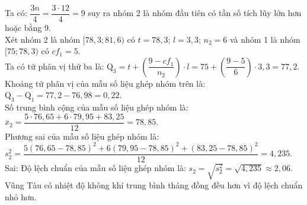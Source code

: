 \begin{ex}
{\begin{itemchoice}
			Ta có: $\dfrac{3n}{4}=\dfrac{3\cdot  12}{4}=9$ suy ra nhóm 2 là nhóm đầu tiên có tần số tích lũy lớn hơn hoặc bằng 9. \\
			Xét nhóm 2 là nhóm $[78{,}3;81{,}6)$ có $t=78{,}3$; $l=3{,}3$; $n_2=6$ và nhóm 1 là nhóm  $[75;78{,}3)$ có $cf_1=5$. \\
			Ta có tứ phân vị thứ ba là: $\mathrm{Q}_3=t+\left(\dfrac{9-cf_1}{n_2}\right)\cdot l =75+\left(\dfrac{9-5}{6}\right)\cdot 3{,}3=77{,}2$.\\ 
			Khoảng  tứ phân vị của mẫu số liệu ghép nhóm trên là: $\mathrm{Q}_3-\mathrm{Q}_1=77{,}2-76{,}98=0{,}22$.\\
			Số trung bình cộng của mẫu số liệu ghép  nhóm là: $\overline{x}_2=\dfrac{5\cdot 76{,}65+6\cdot 79{,}95+83{,}25}{12}=78{,}85$.\\
			 Phương sai của mẫu số liệu ghép nhóm là:\\
			$s_2^2=\dfrac{5(76{,}65-78{,}85)^2+6(79{,}95-78{,}85)^2+(83{,}25-78{,}85)^2}{12}=4{,}235$. 
			\itemch Sai: Độ lệch chuẩn của mẫu số  liệu ghép nhóm là: $s_2=\sqrt{s_2^2}=\sqrt{4{,}235} \approx 2{,}06$.\\
			Vũng Tàu có nhiệt độ không khí trung bình tháng đồng đều  hơn vì độ lệch chuẩn nhỏ hơn.
		\end{itemchoice}
	} 
\end{ex}

